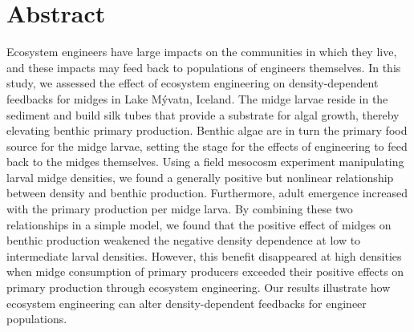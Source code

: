
\section*{Abstract}

Ecosystem engineers have large impacts on the communities in which they live,
and these impacts may feed back to populations of engineers themselves.
In this study, we assessed the effect of ecosystem engineering 
on density-dependent feedbacks for midges in Lake M\'{y}vatn, Iceland. 
The midge larvae reside in the sediment and build silk tubes that provide 
a substrate for algal growth, thereby elevating benthic primary production.
Benthic algae are in turn the primary food source for the midge larvae,
setting the stage for the effects of engineering to feed back to the midges themselves.
Using a field mesocosm experiment manipulating larval midge densities,
we found a generally positive but nonlinear relationship between
density and benthic production.
Furthermore, 
adult emergence increased with the primary production per midge larva.
By combining these two relationships in a simple model,
we found that the positive effect of midges on benthic production 
weakened the negative density dependence at low to intermediate larval densities.
However, this benefit disappeared at high densities when midge consumption 
of primary producers exceeded their positive effects 
on primary production through ecosystem engineering.
Our results illustrate how ecosystem engineering can alter 
density-dependent feedbacks for engineer populations.


